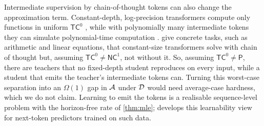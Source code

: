 \noindent
Intermediate supervision by chain-of-thought tokens can also change the approximation term. Constant-depth,
log-precision transformers compute only functions in uniform $\mathsf{TC}^0$ \citep{merrill2023parallelism}, while with
polynomially many intermediate tokens they can simulate polynomial-time computation \citep{merrill2024expressive,li2024chain}.
\citet{feng2023towards} give concrete tasks, such as arithmetic and linear equations, that constant-size transformers
solve with chain of thought but, assuming $\mathsf{TC}^0\neq\mathsf{NC}^1$, not without it. So, assuming $\mathsf{TC}^0\neq\mathsf P$,
there are teachers that no fixed-depth student reproduces on every input, while a student that emits the teacher's
intermediate tokens can. Turning this worst-case separation into an $\Omega(1)$ gap in $\mathcal{A}$ under $\mathcal{D}$ would need
average-case hardness, which we do not claim. Learning to emit the tokens is a realisable sequence-level problem with
the horizon-free rate of \cref{thm:mle}; \citet{malach2024autoregressive} develops this learnability view for next-token
predictors trained on such data.
